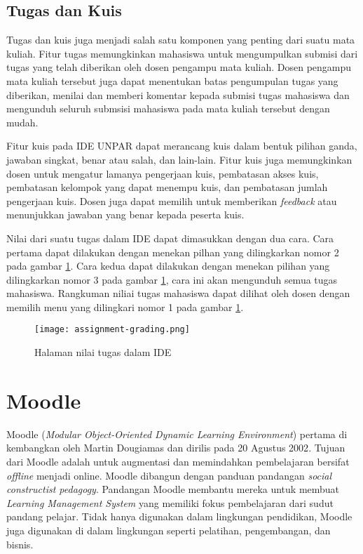 \subsection{Tugas dan Kuis}
Tugas dan kuis juga menjadi salah satu komponen yang penting dari suatu mata kuliah. Fitur tugas memungkinkan mahasiswa untuk mengumpulkan submisi dari tugas yang telah diberikan oleh dosen pengampu mata kuliah. Dosen pengampu mata kuliah tersebut juga dapat menentukan batas pengumpulan tugas yang diberikan, menilai dan memberi komentar kepada submisi tugas mahasiswa dan mengunduh seluruh submsisi mahasiswa pada mata kuliah tersebut dengan mudah.

Fitur kuis pada IDE UNPAR dapat merancang kuis dalam bentuk pilihan ganda, jawaban singkat, benar atau salah, dan lain-lain\cite{IDE:dasar-dasar}. Fitur kuis juga memungkinkan dosen untuk mengatur lamanya pengerjaan kuis, pembatasan akses kuis, pembatasan kelompok yang dapat menempu kuis, dan pembatasan jumlah pengerjaan kuis.  Dosen juga dapat memilih untuk memberikan \textit{feedback} atau menunjukkan jawaban yang benar kepada peserta kuis.

Nilai dari suatu tugas dalam IDE dapat dimasukkan dengan dua cara. Cara pertama dapat dilakukan dengan menekan pilhan yang dilingkarkan nomor 2 pada gambar \ref{fig:grading}. Cara kedua dapat dilakukan dengan menekan pilihan yang dilingkarkan nomor 3 pada gambar \ref{fig:grading}, cara ini akan mengunduh semua tugas mahasiswa. Rangkuman niliai tugas mahasiswa dapat dilihat oleh dosen dengan memilih menu yang dilingkari nomor 1 pada gambar \ref{fig:grading}.
\begin{figure} [ht]
	\centering  
	\texttt{[image: assignment-grading.png]}  
	\caption[Halaman nilai tugas dalam IDE] {Halaman nilai tugas dalam IDE\cite{IDE:dasar-dasar}} 
	\label{fig:grading} 
\end{figure}
\section{Moodle}
\label{sec:Moodle}

Moodle (\textit{Modular Object-Oriented Dynamic Learning Environment}\cite{moodle:39}) pertama di kembangkan oleh Martin Dougiamas dan dirilis pada 20 Agustus 2002\cite{moodle:39}. Tujuan dari Moodle adalah untuk augmentasi dan memindahkan pembelajaran bersifat \textit{offline} menjadi {online}. Moodle dibangun dengan panduan pandangan \textit{social constructist pedagogy}\cite{moodle:39}. Pandangan Moodle membantu mereka untuk membuat \textit{ Learning Management System} yang memiliki fokus pembelajaran dari sudut pandang pelajar. Tidak hanya digunakan dalam lingkungan pendidikan, Moodle juga digunakan di dalam lingkungan seperti pelatihan, pengembangan, dan bisnis.

